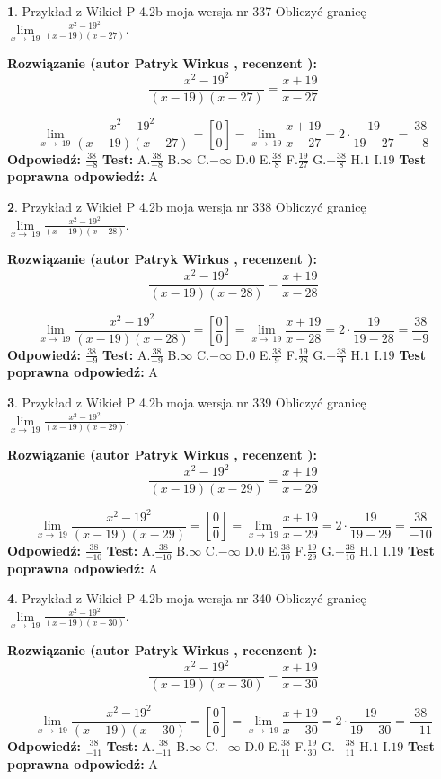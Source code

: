 \documentclass[12pt, a4paper]{article}
\theoremstyle{definition} %
\newtheorem{zad}{}
\newcommand{\zadStart}[1]{\begin{zad}#1\newline}
\newcommand{\zadStop}{\end{zad}}
\newcommand{\rozwStart}[2]{\noindent \textbf{Rozwiązanie (autor #1 , recenzent #2): }\newline}
\newcommand{\rozwStop}{\newline}
\newcommand{\odpStart}{\noindent \textbf{Odpowiedź:}\newline}
\newcommand{\odpStop}{\newline}
\newcommand{\testStart}{\noindent \textbf{Test:}\newline}
\newcommand{\testStop}{\newline}
\newcommand{\kluczStart}{\noindent \textbf{Test poprawna odpowiedź:}\newline}
\newcommand{\kluczStop}{\newline}
\begin{document}
\zadStart{Przykład z Wikieł P 4.2b moja wersja nr 337}
Obliczyć granicę $\lim\limits_{x\to\ 19}\frac{x^{2}-19^{2}}{(x-19)(x-27)}$.
\zadStop
\rozwStart{Patryk Wirkus}{}
$$\frac{x^{2}-19^{2}}{(x-19)(x-27)}=\frac{x+19}{x-27}$$

$$\lim\limits_{x\to\ 19}\frac{x^{2}-19^{2}}{(x-19)(x-27)}=[\frac{0}{0}]=\lim\limits_{x\to\ 19}\frac{x+19}{x-27}=2 \cdot \frac{19}{19-27} = \frac{38}{-8}$$
\rozwStop
\odpStart
$\frac{38}{-8}$
\odpStop
\testStart
A.$\frac{38}{-8}$
B.$\infty$
C.$-\infty$
D.$0$
E.$\frac{38}{8}$
F.$\frac{19}{27}$
G.$-\frac{38}{8}$
H.$1$
I.$19$
\testStop
\kluczStart
A
\kluczStop



\zadStart{Przykład z Wikieł P 4.2b moja wersja nr 338}
Obliczyć granicę $\lim\limits_{x\to\ 19}\frac{x^{2}-19^{2}}{(x-19)(x-28)}$.
\zadStop
\rozwStart{Patryk Wirkus}{}
$$\frac{x^{2}-19^{2}}{(x-19)(x-28)}=\frac{x+19}{x-28}$$

$$\lim\limits_{x\to\ 19}\frac{x^{2}-19^{2}}{(x-19)(x-28)}=[\frac{0}{0}]=\lim\limits_{x\to\ 19}\frac{x+19}{x-28}=2 \cdot \frac{19}{19-28} = \frac{38}{-9}$$
\rozwStop
\odpStart
$\frac{38}{-9}$
\odpStop
\testStart
A.$\frac{38}{-9}$
B.$\infty$
C.$-\infty$
D.$0$
E.$\frac{38}{9}$
F.$\frac{19}{28}$
G.$-\frac{38}{9}$
H.$1$
I.$19$
\testStop
\kluczStart
A
\kluczStop



\zadStart{Przykład z Wikieł P 4.2b moja wersja nr 339}
Obliczyć granicę $\lim\limits_{x\to\ 19}\frac{x^{2}-19^{2}}{(x-19)(x-29)}$.
\zadStop
\rozwStart{Patryk Wirkus}{}
$$\frac{x^{2}-19^{2}}{(x-19)(x-29)}=\frac{x+19}{x-29}$$

$$\lim\limits_{x\to\ 19}\frac{x^{2}-19^{2}}{(x-19)(x-29)}=[\frac{0}{0}]=\lim\limits_{x\to\ 19}\frac{x+19}{x-29}=2 \cdot \frac{19}{19-29} = \frac{38}{-10}$$
\rozwStop
\odpStart
$\frac{38}{-10}$
\odpStop
\testStart
A.$\frac{38}{-10}$
B.$\infty$
C.$-\infty$
D.$0$
E.$\frac{38}{10}$
F.$\frac{19}{29}$
G.$-\frac{38}{10}$
H.$1$
I.$19$
\testStop
\kluczStart
A
\kluczStop



\zadStart{Przykład z Wikieł P 4.2b moja wersja nr 340}
Obliczyć granicę $\lim\limits_{x\to\ 19}\frac{x^{2}-19^{2}}{(x-19)(x-30)}$.
\zadStop
\rozwStart{Patryk Wirkus}{}
$$\frac{x^{2}-19^{2}}{(x-19)(x-30)}=\frac{x+19}{x-30}$$

$$\lim\limits_{x\to\ 19}\frac{x^{2}-19^{2}}{(x-19)(x-30)}=[\frac{0}{0}]=\lim\limits_{x\to\ 19}\frac{x+19}{x-30}=2 \cdot \frac{19}{19-30} = \frac{38}{-11}$$
\rozwStop
\odpStart
$\frac{38}{-11}$
\odpStop
\testStart
A.$\frac{38}{-11}$
B.$\infty$
C.$-\infty$
D.$0$
E.$\frac{38}{11}$
F.$\frac{19}{30}$
G.$-\frac{38}{11}$
H.$1$
I.$19$
\testStop
\kluczStart
A
\kluczStop
\end{document}
